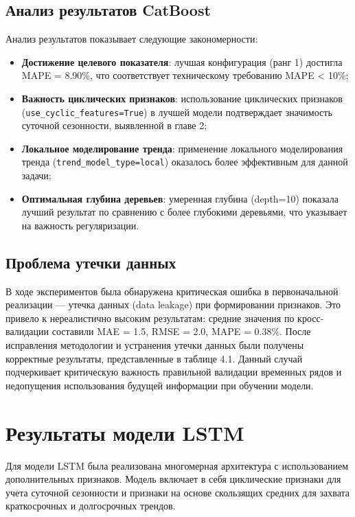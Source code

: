\subsection{Анализ результатов CatBoost}

\hspace*{1.25cm}Анализ результатов показывает следующие закономерности:

\begin{itemize}
	\item \textbf{Достижение целевого показателя}: лучшая конфигурация (ранг 1) достигла MAPE = 8.90\%, что соответствует техническому требованию MAPE < 10\%;
	\item \textbf{Важность циклических признаков}: использование циклических признаков (\texttt{use\_cyclic\_features=True}) в лучшей модели подтверждает значимость суточной сезонности, выявленной в главе 2;
	\item \textbf{Локальное моделирование тренда}: применение локального моделирования тренда (\texttt{trend\_model\_type=local}) оказалось более эффективным для данной задачи;
	\item \textbf{Оптимальная глубина деревьев}: умеренная глубина (depth=10) показала лучший результат по сравнению с более глубокими деревьями, что указывает на важность регуляризации.
\end{itemize}

\subsection{Проблема утечки данных}

\hspace*{1.25cm}В ходе экспериментов была обнаружена критическая ошибка в первоначальной реализации --- утечка данных (data leakage) при формировании признаков. Это привело к нереалистично высоким результатам: средние значения по кросс-валидации составили MAE = 1.5, RMSE = 2.0, MAPE = 0.38\%. После исправления методологии и устранения утечки данных были получены корректные результаты, представленные в таблице 4.1. Данный случай подчеркивает критическую важность правильной валидации временных рядов и недопущения использования будущей информации при обучении модели.

\section{Результаты модели LSTM}
\label{sec:lstm_results}

\hspace*{1.25cm}Для модели LSTM была реализована многомерная архитектура с использованием дополнительных признаков. Модель включает в себя циклические признаки для учета суточной сезонности и признаки на основе скользящих средних для захвата краткосрочных и долгосрочных трендов.

